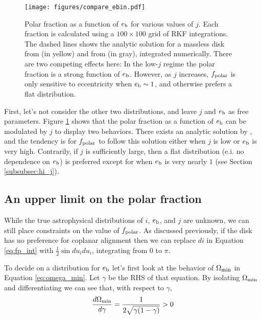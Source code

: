 \documentclass[twocolumn]{aastex631}
\begin{document}
\begin{figure*}
    \begin{centering}
        \texttt{[image: figures/compare\_ebin.pdf]}
        \caption{
            Polar fraction as a function of $e_{\rm b}$ for various values of $j$. Each fraction is calculated using a $100\times 100$ grid of RKF integrations.
            The dashed lines shows the analytic solution for a massless disk from \citet{zanazzi2018} (in yellow) and from \citet{martin2019} (in gray), integrated numerically.
            There are two competing effects here:
            In the low-$j$ regime the polar fraction is a strong function of $e_{\rm b}$. However, as $j$ increases, $f_{\rm polar}$ is only sensitive to eccentricity
            when $e_{\rm b} \sim 1$, and otherwise prefers a flat distribution.
        }
        \label{fig:ebin}
    \end{centering}
\end{figure*}

First, let's not consider the other two distributions, and leave $j$ and $e_{\rm b}$ as free parameters. Figure \ref{fig:ebin} shows that the polar fraction
as a function of $e_{\rm b}$ can be modulated by $j$ to display two behaviors. There exists an analytic solution by \citet{zanazzi2018}, and the tendency is
for $f_{\rm polar}$ to follow this solution either when $j$ is low or $e_{\rm b}$ is very high. Contrarily, if $j$ is sufficiently large, then a flat distribution
(e.i. no dependence on $e_{\rm b}$) is preferred except for when $e_{\rm b}$ is very nearly $1$ (see Section \ref{subsubsec:hi_j}).

\subsection{An upper limit on the polar fraction}
\label{subsec:fp_limit}
While the true astrophysical distributions of $i$, $e_{\rm b}$, and $j$ are unknown, we can still place constraints on the value of $f_{\rm polar}$.
As discussed previously, if the disk has no preference for coplanar alignment then we can replace $di$ in Equation \ref{eq:fp_int} with $\frac{1}{2}\sin{du_i}du_i$, integrating
from 0 to $\pi$.

To decide on a distribution for $e_{\rm b}$ let's first look at the behavior of $\Omega_{\rm min}$ in Equation \ref{eq:omega_min}. Let $\gamma$
be the RHS of that equation. By isolating $\Omega_{\rm min}$ and differentiating we can see that, with respect to $\gamma$,
\begin{equation}
    \frac{d\Omega_{\rm min}}{d \gamma} = \frac{1}{2\sqrt{ \gamma (1 - \gamma)}} > 0
\end{equation}
\end{document}
